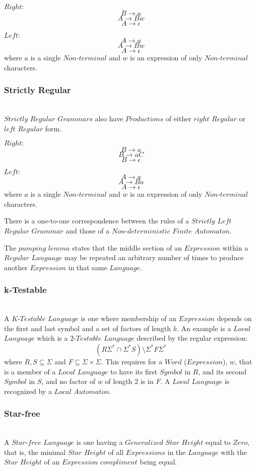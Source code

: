 \documentclass{article}
\begin{document}
$Right:$
\[
    B \rightarrow a
\]\[
    A \rightarrow Bw
\]\[
    A \rightarrow \epsilon
\]

$Left:$
\[
    A \rightarrow a
\]\[
    A \rightarrow Bw
\]\[
    A \rightarrow \epsilon
\]
where $a$ is a single $Non$-$terminal$ and $w$ is an expression of
only $Non$-$terminal$ characters.

\subsubsection{Strictly Regular} \hfill \\
$Strictly$ $Regular$ $Grammars$ also have $Productions$ of either
$right$ $Regular$ or $left$ $Regular$ form.

$Right:$
\[
    B \rightarrow a
\]\[
    B \rightarrow aC
\]\[
    B \rightarrow \epsilon
\]

$Left:$
\[
    A \rightarrow a
\]\[
    A \rightarrow Ba
\]\[
    A \rightarrow \epsilon
\]
where $a$ is a single $Non$-$terminal$ and $w$ is an expression of
only $Non$-$terminal$ characters.

There is a one-to-one correspondence between the rules of a $Strictly$
$Left$ $Regular$ $Grammar$ and those of a $Non$-$deterministic$
$Finite$ $Automaton$.

The $pumping$ $lemma$ states that the middle section of an
$Expression$ within a $Regular$ $Language$ may be repeated an
arbitrary number of times to produce another $Expression$ in that same
$Language$.

\subsubsection{k-Testable} \hfill \\
A $K$-$Testable$ $Language$ is one where membership of an $Expression$
depends on the first and last symbol and a set of factors of length
$k$. An example is a $Local$ $Language$ which is a $2$-$Testable$
$Language$ described by the regular expression:
\[
    (R\Sigma^* \cap \Sigma^*S)\setminus\Sigma^*F\Sigma^*
\]
where $R,S \subseteq \Sigma$ and $F \subseteq \Sigma \times
\Sigma$. This requires for a $Word$ ($Expression$), $w$, that is a
member of a $Local$ $Language$ to have its first $Symbol$ in $R$, and
its second $Symbol$ in $S$, and no factor of $w$ of length 2 is in
$F$. A $Local$ $Language$ is recognized by a $Local$ $Automaton$.

\subsubsection{Star-free} \hfill \\
A $Star$-$free$ $Language$ is one having a $Generalized$ $Star$
$Height$ equal to $Zero$, that is, the minimal $Star$ $Height$ of all
$Expressions$ in the $Language$ with the $Star$ $Height$ of an
$Expression$ $compliment$ being equal.
\end{document}
